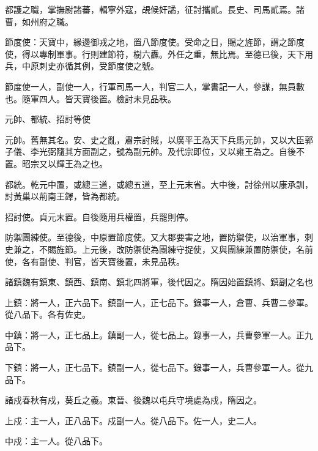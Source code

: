 \begin{pinyinscope}
 都護之職，掌撫尉諸蕃，輯寧外寇，覘候奸譎，征討攜貳。長史、司馬貳焉。諸曹，如州府之職。



 節度使：天寶中，緣邊御戎之地，置八節度使。受命之日，賜之旌節，謂之節度使，得以專制軍事。行則建節符，樹六纛。外任之重，無比焉。至德已後，天下用兵，中原刺史亦循其例，受節度使之號。



 節度使一人，副使一人，行軍司馬一人，判官二人，掌書記一人，參謀，無員數也。隨軍四人。皆天寶後置。檢討未見品秩。



 元帥、都統、招討等使



 元帥。舊無其名。安、史之亂，肅宗討賊，以廣平王為天下兵馬元帥，又以大臣郭子儀、李光弼隨其方面副之，號為副元帥。及代宗即位，又以雍王為之。自後不置。昭宗又以輝王為之也。



 都統。乾元中置，或總三道，或總五道，至上元末省。大中後，討徐州以康承訓，討黃巢以荊南王鐸，皆為都統。



 招討使。貞元末置。自後隨用兵權置，兵罷則停。



 防禦團練使。至德後，中原置節度使。又大郡要害之地，置防禦使，以治軍事，刺史兼之，不賜旌節。上元後，改防禦使為團練守捉使，又與團練兼置防禦使，名前使，各有副使、判官，皆天寶後置，未見品秩。



 諸鎮魏有鎮東、鎮西、鎮南、鎮北四將軍，後代因之。隋因始置鎮將、鎮副之名也



 上鎮：將一人，正六品下。鎮副一人，正七品下。錄事一人，倉曹、兵曹二參軍。從八品下。各有佐史。



 中鎮：將一人，正七品上。鎮副一人，從七品上。錄事一人，兵曹參軍一人。正九品下。



 下鎮：將一人，正七品下。鎮副一人，從七品下。錄事一人，兵曹參軍一人。從九品下。



 諸戍春秋有戍，葵丘之義。東晉、後魏以屯兵守境處為戍，隋因之。



 上戍：主一人，正八品下。戍副一人。從八品下。佐一人，史二人。



 中戍：主一人。從八品下。




\end{pinyinscope}
